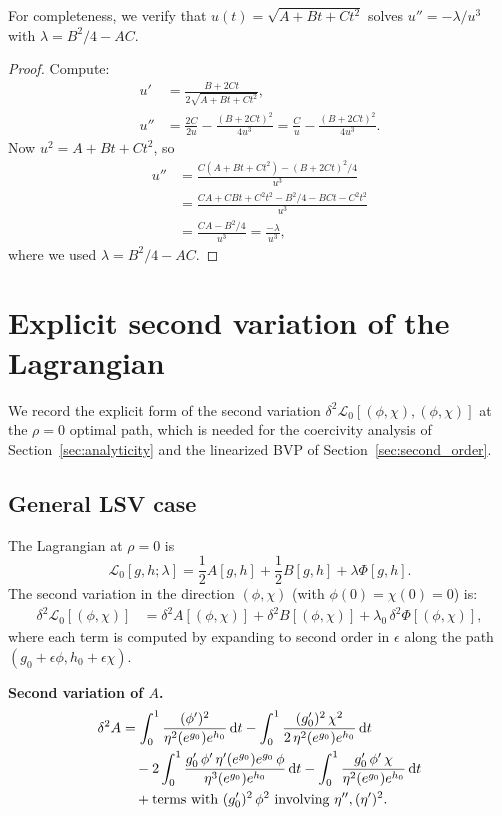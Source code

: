 \documentclass[11pt]{article}
\theoremstyle{definition}
\newcommand{\dd}{\mathrm{d}}
\begin{document}
For completeness, we verify that $u(t) = \sqrt{A + Bt + Ct^2}$ solves $u'' = -\lambda/u^3$ with $\lambda = B^2/4 - AC$.

\begin{proof}
Compute:
\begin{align}
  u' &= \frac{B + 2Ct}{2\sqrt{A + Bt + Ct^2}}, \\
  u'' &= \frac{2C}{2u} - \frac{(B+2Ct)^2}{4u^3} = \frac{C}{u} - \frac{(B+2Ct)^2}{4u^3}.
\end{align}
Now $u^2 = A + Bt + Ct^2$, so
\begin{align}
  u'' &= \frac{C(A + Bt + Ct^2) - (B+2Ct)^2/4}{u^3} \\
  &= \frac{CA + CBt + C^2t^2 - B^2/4 - BCt - C^2t^2}{u^3} \\
  &= \frac{CA - B^2/4}{u^3} = \frac{-\lambda}{u^3},
\end{align}
where we used $\lambda = B^2/4 - AC$.
\end{proof}

\section{Explicit second variation of the Lagrangian}\label{app:second_variation}

We record the explicit form of the second variation $\delta^2\mathcal{L}_0[(\phi,\chi),(\phi,\chi)]$ at the $\rho=0$ optimal path, which is needed for the coercivity analysis of Section~\ref{sec:analyticity} and the linearized BVP of Section~\ref{sec:second_order}.

\subsection{General LSV case}

The Lagrangian at $\rho=0$ is
\begin{equation}
  \mathcal{L}_0[g,h;\lambda] = \frac{1}{2}A[g,h] + \frac{1}{2}B[g,h] + \lambda\Phi[g,h].
\end{equation}
The second variation in the direction $(\phi, \chi)$ (with $\phi(0) = \chi(0) = 0$) is:
\begin{align}
  \delta^2\mathcal{L}_0[(\phi,\chi)] &= \delta^2 A[(\phi,\chi)] + \delta^2 B[(\phi,\chi)] + \lambda_0\,\delta^2\Phi[(\phi,\chi)],
\end{align}
where each term is computed by expanding to second order in $\epsilon$ along the path $(g_0 + \epsilon\phi, h_0 + \epsilon\chi)$.

\textbf{Second variation of $A$.}
\begin{align}
  \delta^2 A &= \int_0^1 \frac{(\phi')^2}{\eta^2(e^{g_0})e^{h_0}}\,\dd t - \int_0^1 \frac{(g_0')^2\,\chi^2}{2\,\eta^2(e^{g_0})e^{h_0}}\,\dd t \notag\\
  &\quad - 2\int_0^1 \frac{g_0'\,\phi'\,\eta'(e^{g_0})e^{g_0}\,\phi}{\eta^3(e^{g_0})e^{h_0}}\,\dd t - \int_0^1 \frac{g_0'\,\phi'\,\chi}{\eta^2(e^{g_0})e^{h_0}}\,\dd t \notag\\
  &\quad + \text{terms with } (g_0')^2\,\phi^2 \text{ involving } \eta'', (\eta')^2.
\end{align}
\end{document}
